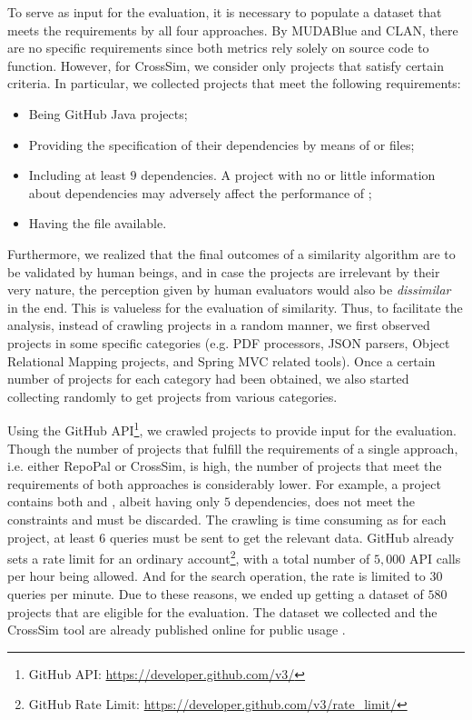 To serve as input for the evaluation, it is necessary to populate a dataset that meets the requirements by all four approaches. By MUDABlue and CLAN, there are no specific requirements since both metrics rely solely on source code to function. However, for CrossSim, we consider only projects that satisfy certain criteria. In particular, we collected projects that meet the following requirements:

\begin{itemize}
	\item Being GitHub Java projects; 
	\item Providing the specification of their dependencies by means of  or  files;
	\item Including at least $9$ dependencies. A project with no or little information about dependencies may adversely affect the performance of \CrossSim; 
	\item Having the  file available.
\end{itemize}

Furthermore, we realized that the final outcomes of a similarity algorithm are to be validated by human beings, and in case the projects are irrelevant by their very nature, the perception given by human evaluators would also be \emph{dissimilar} in the end. This is valueless for the evaluation of similarity. Thus, to facilitate the analysis, instead of crawling projects in a random manner, we first observed projects in some specific categories (e.g. PDF processors, JSON parsers, Object Relational Mapping projects, and Spring MVC related tools). Once a certain number of projects for each category had been obtained, we also started collecting randomly to get projects from various categories.

Using the GitHub API\footnote{GitHub API: \url{https://developer.github.com/v3/}}, we crawled projects to provide input for the evaluation. Though the number of projects that fulfill the requirements of a single approach, i.e. either RepoPal or CrossSim, is high, the number of projects that meet the requirements of both approaches is considerably lower. For example, a project contains both  and , albeit having only $5$ dependencies, does not meet the constraints and must be discarded. The crawling is time consuming as for each project, at least $6$ queries must be sent to get the relevant data. GitHub already sets a rate limit for an ordinary account\footnote{GitHub Rate Limit: \url{https://developer.github.com/v3/rate_limit/}}, with a total number of $5,000$ API calls per hour being allowed. And for the search operation, the rate is limited to $30$ queries per minute. Due to these reasons, we ended up getting a dataset of $580$ projects that are eligible for the evaluation. The dataset we collected and the CrossSim tool are already published online for public usage \cite{CROSSSIM-DATA}.

